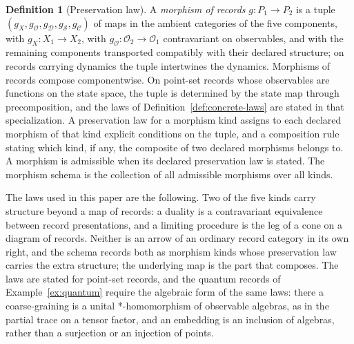 \documentclass[11pt,letterpaper]{article}
\theoremstyle{definition}
\newtheorem{definition}[theorem]{Definition}
\theoremstyle{remark}
\begin{document}
\begin{definition}[Preservation law]
\label{def:preservation-law}
A \emph{morphism of records} $g \colon P_1 \to P_2$ is a tuple $(g_X, g_{\mathcal{O}}, g_{\mathcal{D}}, g_{\mathcal{S}}, g_{\mathcal{C}})$ of maps in the ambient categories of the five components, with $g_X \colon X_1 \to X_2$, with $g_{\mathcal{O}} \colon \mathcal{O}_2 \to \mathcal{O}_1$ contravariant on observables, and with the remaining components transported compatibly with their declared structure; on records carrying dynamics the tuple intertwines the dynamics. Morphisms of records compose componentwise. On point-set records whose observables are functions on the state space, the tuple is determined by the state map through precomposition, and the laws of Definition~\ref{def:concrete-laws} are stated in that specialization. A preservation law for a morphism kind assigns to each declared morphism of that kind explicit conditions on the tuple, and a composition rule stating which kind, if any, the composite of two declared morphisms belongs to. A morphism is admissible when its declared preservation law is stated. The morphism schema is the collection of all admissible morphisms over all kinds.
\end{definition}

The laws used in this paper are the following. Two of the five kinds carry structure beyond a map of records: a duality is a contravariant equivalence between record presentations, and a limiting procedure is the leg of a cone on a diagram of records. Neither is an arrow of an ordinary record category in its own right, and the schema records both as morphism kinds whose preservation law carries the extra structure; the underlying map is the part that composes. The laws are stated for point-set records, and the quantum records of Example~\ref{ex:quantum} require the algebraic form of the same laws: there a coarse-graining is a unital *-homomorphism of observable algebras, as in the partial trace on a tensor factor, and an embedding is an inclusion of algebras, rather than a surjection or an injection of points.
\end{document}
